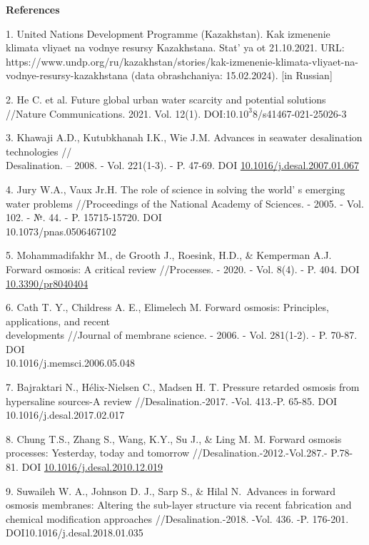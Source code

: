 \begin{center}
{\bfseries References}
\end{center}

\begin{references}
1. United Nations Development Programme (Kazakhstan). Kak izmenenie
klimata vliyaet na vodnye resursy Kazakhstana. Stat' ya
ot 21.10.2021. URL:
https://www.undp.org/ru/kazakhstan/stories/kak-izmenenie-klimata-vliyaet-na-vodnye-resursy-kazakhstana
(data obrashchaniya: 15.02.2024). {[}in Russian{]}

2. He C. et al. Future global urban water scarcity and potential
solutions //Nature Communications. 2021. Vol. 12(1).
DOI:10.$10^3$8/s41467-021-25026-3

3. Khawaji A.D., Kutubkhanah I.K., Wie J.M. Advances in seawater
desalination technologies // \\Desalination. -- 2008. - Vol. 221(1-3). -
P. 47-69. DOI
\href{http://dx.doi.org/10.1016/j.desal.2007.01.067}{10.1016/j.desal.2007.01.067}

4. Jury W.A., Vaux Jr.H. The role of science in solving the
world' s emerging water problems //Proceedings of the
National Academy of Sciences. - 2005. - Vol. 102. - №. 44. - P.
15715-15720. DOI \\10.1073/pnas.0506467102

5. Mohammadifakhr M., de Grooth J., Roesink, H.D., \& Kemperman A.J.
Forward osmosis: A critical review //Processes. - 2020. - Vol. 8(4). -
P. 404. DOI
\href{http://dx.doi.org/10.3390/pr8040404}{10.3390/pr8040404}

6. Cath T. Y., Childress A. E., Elimelech M. Forward osmosis: Principles,
applications, and recent \\developments //Journal of membrane science. -
2006. - Vol. 281(1-2). - P. 70-87. DOI \\10.1016/j.memsci.2006.05.048

7. Bajraktari N., Hélix-Nielsen C., Madsen H. T. Pressure retarded osmosis
from hypersaline sources-A review //Desalination.-2017. -Vol. 413.-P.
65-85. DOI 10.1016/j.desal.2017.02.017

8. Chung T.S., Zhang S., Wang, K.Y., Su J., \& Ling M. M. Forward osmosis
processes: Yesterday, today and tomorrow
//Desalination.-2012.-Vol.287.- P.78-81.
DOI \href{http://dx.doi.org/10.1016/j.desal.2010.12.019}{10.1016/j.desal.2010.12.019}

9. Suwaileh W. A., Johnson D. J., Sarp S., \& Hilal N.~Advances in
forward osmosis membranes: Altering the sub-layer structure via recent
fabrication and chemical modification approaches //Desalination.-2018.
-Vol. 436. -P. 176-201. DOI10.1016/j.desal.2018.01.035


\end{references}
